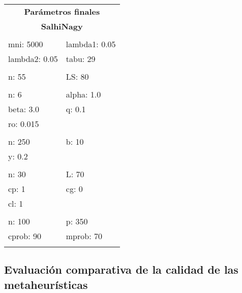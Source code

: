 \begin{table}[h]
\begin{minipage}[ht]{0.386\linewidth}
\begin{table}[H]
\begin{tabular}{|ll}
\hline\hline
\multicolumn{2}{c}{\textbf{Parámetros finales}}\\
\multicolumn{2}{c}{\textbf{SalhiNagy}}\\
\hline\hline\\
			mni: 5000     & lambda1: 0.05\\  
			lambda2: 0.05 & tabu: 29 \\ [0.7ex]\cline{1-2}\\
			n: 55 & LS: 80 \\ [0.7ex]\cline{1-2}\\
			n: 6 		& alpha: 1.0 \\  
			beta: 3.0 & q: 0.1\\
			ro: 0.015 & \\ [0.7ex]\cline{1-2}\\
			n: 250 & b: 10\\  
			y: 0.2 & \\ [0.7ex]\cline{1-2}\\
			n: 30 & L: 70\\
			cp: 1 & cg: 0\\
			cl: 1 & \\ [0.7ex]\cline{1-2}\\
			n: 100    & p: 350 \\  
		   cprob: 90 & mprob: 70 \\
\\ \hline\hline
\end{tabular}
\end{table}
\end{minipage}
\end{table}

\subsection{Evaluación comparativa de la calidad de las metaheurísticas} \label{subsect:evaluacioncomparativa}

